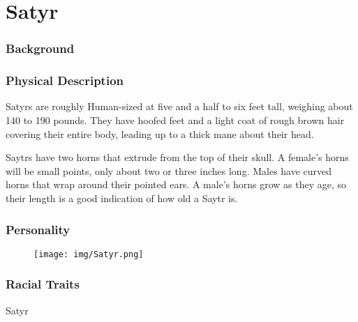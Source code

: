 \chapter*{Satyr}

\subsection*{Background}

\lipsum[1]

\subsection*{Physical Description}

Satyrs are roughly Human-sized at five and a half to six feet tall, weighing about 140 to 190 pounds. They have hoofed feet and a light coat of rough brown hair covering their entire body, leading up to a thick mane about their head. 

Saytrs have two horns that extrude from the top of their skull. A female’s horns will be small points, only about two or three inches long. Males have curved horns that wrap around their pointed ears. A male’s horns grow as they age, so their length is a good indication of how old a Saytr is. 

\subsection*{Personality}

\lipsum[1]

\begin{figure}[ht!]
	\texttt{[image: img/Satyr.png]}
\end{figure}

\subsection*{Racial Traits}
\begin{monsterbox}{Satyr}
	\vspace{.1in}
	\hline
	\stats[
	STR = +1,
	DEX = +1,
	VIT = +1,
	FOC = -1,
	WILL = -1
	]
	\hline
\end{monsterbox}